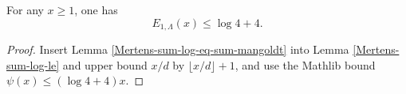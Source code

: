 \begin{corollary}
\label{Mertens-first-error-mangoldt-le}
\leanok
For any $x \geq 1$, one has
$$ E_{1,\Lambda}(x) \leq \log 4 + 4.$$
\end{corollary}
\begin{proof}
\leanok
Insert Lemma \ref{Mertens-sum-log-eq-sum-mangoldt} into Lemma \ref{Mertens-sum-log-le} and upper bound $x/d$ by $\lfloor x/d \rfloor + 1$, and use the Mathlib bound $\psi(x) \leq (\log 4 + 4) x$.
\end{proof}
